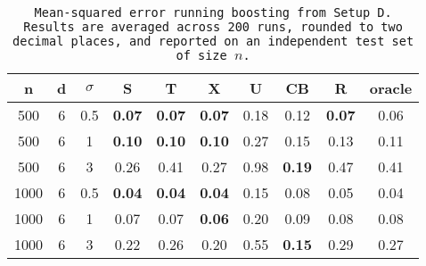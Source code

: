 \begin{table}[ht]
\centering
\begin{tabular}{cccccccccc}
  \hline
n & d & $\sigma$ & S & T & X & U & CB & R & oracle \\ 
  \hline
500 & 6 & 0.5 & \bf 0.07 & \bf 0.07 & \bf 0.07 & 0.18 & 0.12 & \bf 0.07 & 0.06 \\ 
  500 & 6 & 1 & \bf 0.10 & \bf 0.10 & \bf 0.10 & 0.27 & 0.15 & 0.13 & 0.11 \\ 
  500 & 6 & 3 & 0.26 & 0.41 & 0.27 & 0.98 & \bf 0.19 & 0.47 & 0.41 \\ 
  1000 & 6 & 0.5 & \bf 0.04 & \bf 0.04 & \bf 0.04 & 0.15 & 0.08 & 0.05 & 0.04 \\ 
  1000 & 6 & 1 & 0.07 & 0.07 & \bf 0.06 & 0.20 & 0.09 & 0.08 & 0.08 \\ 
  1000 & 6 & 3 & 0.22 & 0.26 & 0.20 & 0.55 & \bf 0.15 & 0.29 & 0.27 \\ 
   \hline
\end{tabular}
\caption{\tt Mean-squared error running \texttt{boosting} from Setup D. Results are averaged across 200 runs, rounded to two decimal places, and reported on an independent test set of size $n$.} 
\label{table:setup4}
\end{table}
